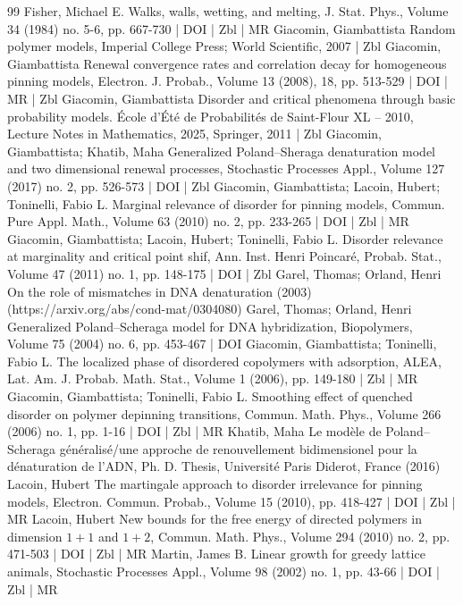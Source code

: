 \documentclass[10pt]{amsart}
\theoremstyle{definition}\newtheorem{defi}[theo]{Definition}\newtheorem{rema}[theo]{Remark}\newtheorem{exam}[theo]{Example}\newtheorem{exem}[theo]{Example}\newtheorem{nota}[theo]{Notation}
\begin{document}
\begin{thebibliography}{99}
Fisher, Michael E. Walks, walls, wetting, and melting, J. Stat. Phys., Volume 34 (1984) no. 5-6, pp. 667-730 | DOI | Zbl | MR
Giacomin, Giambattista Random polymer models, Imperial College Press; World Scientific, 2007 | Zbl
Giacomin, Giambattista Renewal convergence rates and correlation decay for homogeneous pinning models, Electron. J. Probab., Volume 13 (2008), 18, pp. 513-529 | DOI | MR | Zbl
Giacomin, Giambattista Disorder and critical phenomena through basic probability models. École d’Été de Probabilités de Saint-Flour XL – 2010, Lecture Notes in Mathematics, 2025, Springer, 2011 | Zbl
Giacomin, Giambattista; Khatib, Maha Generalized Poland–Sheraga denaturation model and two dimensional renewal processes, Stochastic Processes Appl., Volume 127 (2017) no. 2, pp. 526-573 | DOI | Zbl
Giacomin, Giambattista; Lacoin, Hubert; Toninelli, Fabio L. Marginal relevance of disorder for pinning models, Commun. Pure Appl. Math., Volume 63 (2010) no. 2, pp. 233-265 | DOI | Zbl | MR
Giacomin, Giambattista; Lacoin, Hubert; Toninelli, Fabio L. Disorder relevance at marginality and critical point shif, Ann. Inst. Henri Poincaré, Probab. Stat., Volume 47 (2011) no. 1, pp. 148-175 | DOI | Zbl
Garel, Thomas; Orland, Henri On the role of mismatches in DNA denaturation (2003) (https://arxiv.org/abs/cond-mat/0304080)
Garel, Thomas; Orland, Henri Generalized Poland–Scheraga model for DNA hybridization, Biopolymers, Volume 75 (2004) no. 6, pp. 453-467 | DOI
Giacomin, Giambattista; Toninelli, Fabio L. The localized phase of disordered copolymers with adsorption, ALEA, Lat. Am. J. Probab. Math. Stat., Volume 1 (2006), pp. 149-180 | Zbl | MR
Giacomin, Giambattista; Toninelli, Fabio L. Smoothing effect of quenched disorder on polymer depinning transitions, Commun. Math. Phys., Volume 266 (2006) no. 1, pp. 1-16 | DOI | Zbl | MR
Khatib, Maha Le modèle de Poland–Scheraga généralisé/une approche de renouvellement bidimensionel pour la dénaturation de l’ADN, Ph. D. Thesis, Université Paris Diderot, France (2016)
Lacoin, Hubert The martingale approach to disorder irrelevance for pinning models, Electron. Commun. Probab., Volume 15 (2010), pp. 418-427 | DOI | Zbl | MR
Lacoin, Hubert New bounds for the free energy of directed polymers in dimension $1+1$ and $1+2$, Commun. Math. Phys., Volume 294 (2010) no. 2, pp. 471-503 | DOI | Zbl | MR
Martin, James B. Linear growth for greedy lattice animals, Stochastic Processes Appl., Volume 98 (2002) no. 1, pp. 43-66 | DOI | Zbl | MR

\end{thebibliography}
\end{document}
